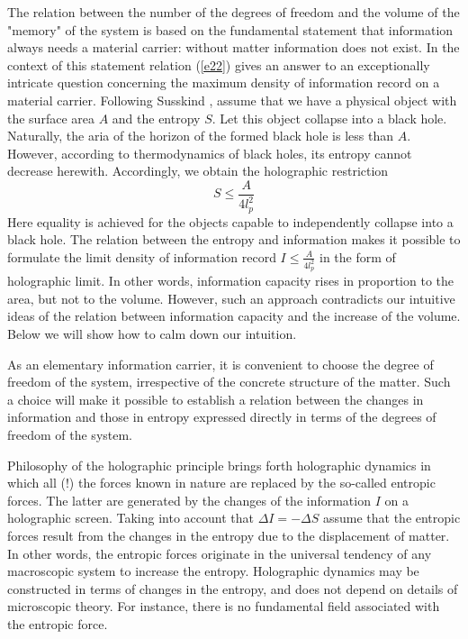 \documentclass [12pt]{article}
\begin{document}
The relation between the number of the degrees of freedom and the volume of the  "memory" of the system is based on the fundamental statement that information always needs a material  carrier: without matter information does not exist.  In the context of this statement  relation  (\ref{e22}) gives an answer to an exceptionally intricate question concerning the maximum density of information record on a material carrier. Following  Susskind \cite{s22}, assume that we have  a physical object with the surface area  $A$ and the entropy $S$. Let this object collapse into a black hole. Naturally, the aria of the horizon of the formed black hole is less than $A$. However, according to thermodynamics of black holes, its entropy cannot decrease herewith.  Accordingly, we obtain the holographic restriction
\begin{equation}\label{e23}
  S \le \frac{A}{{4l_p^2}}
\end{equation}
Here equality is achieved for the objects capable to independently collapse into a black hole.   The relation between the entropy and information makes it possible to formulate the limit density of information record $I \le \frac{A}{{4l_p^2}}$ in the form of holographic limit. In other words, information capacity rises in proportion to the area, but not to the volume. However, such an approach contradicts our intuitive ideas of the relation between  information capacity and the increase of the volume. Below we will show how to calm down our intuition.

As an elementary information carrier, it is convenient to choose the degree of freedom of the system, irrespective of the concrete structure of the matter. Such a choice will make it possible to establish a  relation between the changes in information and those in entropy  expressed directly in terms of the degrees of freedom of the system.

Philosophy of the holographic principle brings forth holographic dynamics in which all (!) the forces known in  nature are replaced by the so-called entropic forces. The latter  are generated by the changes of the information  $I$ on a holographic screen. Taking into account that  $\Delta I =  - \Delta S$ assume that the entropic forces result from the changes in the entropy  due to the displacement  of matter. In other words, the entropic forces originate in the universal tendency of any macroscopic system to increase the entropy. Holographic dynamics may be constructed  in terms of changes in the entropy, and does not depend on details of microscopic theory.  For instance, there is no fundamental field associated with the entropic force.
\end{document}
